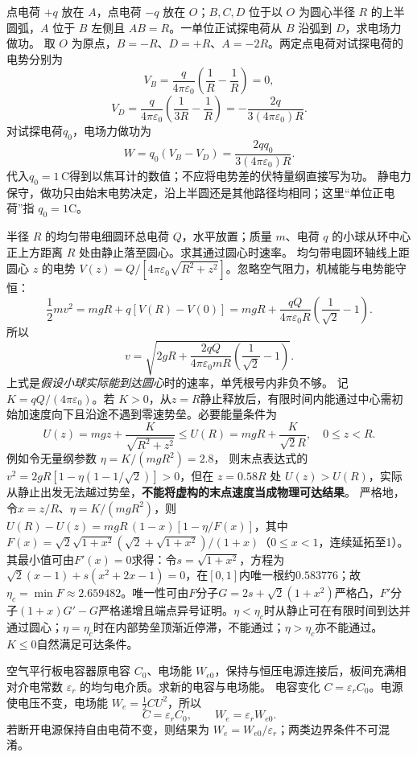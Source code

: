 \problemtext 点电荷 $+q$ 放在 $A$，点电荷 $-q$ 放在 $O$；$B,C,D$ 位于以 $O$ 为圆心半径 $R$ 的上半圆弧，$A$ 位于 $B$ 左侧且 $AB=R$。一单位正试探电荷从 $B$ 沿弧到 $D$，求电场力做功。
\workings 取 $O$ 为原点，$B=-R$、$D=+R$、$A=-2R$。两定点电荷对试探电荷的电势分别为
\[V_B=\frac q{4\pi\varepsilon_0}\left(\frac1R-\frac1R\right)=0,\]
\[V_D=\frac q{4\pi\varepsilon_0}\left(\frac1{3R}-\frac1R\right)
=-\frac{2q}{3(4\pi\varepsilon_0)R}.\]
对试探电荷$q_0$，电场力做功为
\[\boxed{W=q_0(V_B-V_D)=\frac{2qq_0}{3(4\pi\varepsilon_0)R}}.\]
代入$q_0=1\,\mathrm C$得到以焦耳计的数值；不应将电势差的伏特量纲直接写为功。
\crosscheck 静电力保守，做功只由始末电势决定，沿上半圆还是其他路径均相同；这里“单位正电荷”指 $q_0=1$C。

\problemtext 半径 $R$ 的均匀带电细圆环总电荷 $Q$，水平放置；质量 $m$、电荷 $q$ 的小球从环中心正上方距离 $R$ 处由静止落至圆心。求其通过圆心时速率。
\workings 均匀带电圆环轴线上距圆心 $z$ 的电势 $V(z)=Q/[4\pi\varepsilon_0\sqrt{R^2+z^2}]$。忽略空气阻力，机械能与电势能守恒：
\[
\frac12 mv^2=mgR+q[V(R)-V(0)]
=mgR+\frac{qQ}{4\pi\varepsilon_0R}
\left(\frac1{\sqrt2}-1\right).
\]
所以
\[
\boxed{v=\sqrt{2gR+\frac{2qQ}{4\pi\varepsilon_0mR}
\left(\frac1{\sqrt2}-1\right)}}.
\]
\crosscheck 上式是\emph{假设小球实际能到达圆心}时的速率，单凭根号内非负不够。
记 $K=qQ/(4\pi\varepsilon_0)$。若 $K>0$，从$z=R$静止释放后，有限时间内能通过中心需初始加速度向下且沿途不遇到零速势垒。必要能量条件为
\[
U(z)=mgz+\frac{K}{\sqrt{R^2+z^2}}\le
U(R)=mgR+\frac{K}{\sqrt2R},\quad 0\le z<R.
\]
例如令无量纲参数 $\eta=K/(mgR^2)=2.8$，
则末点表达式的 $v^2=2gR[1-\eta(1-1/\sqrt2)]>0$，但在 $z=0.58R$ 处 $U(z)>U(R)$，实际从静止出发无法越过势垒，\textbf{不能将虚构的末点速度当成物理可达结果}。
严格地，令$x=z/R$、$\eta=K/(mgR^2)$，则$U(R)-U(z)=mgR\,(1-x)\left[1-\eta/F(x)\right]$，其中$F(x)=\sqrt2\sqrt{1+x^2}(\sqrt2+\sqrt{1+x^2})/(1+x)$（$0\le x<1$，连续延拓至1）。其最小值可由$F'(x)=0$求得：令$s=\sqrt{1+x^2}$，方程为$\sqrt2(x-1)+s(x^2+2x-1)=0$，在$[0,1]$内唯一根约$0.583776$；故$\eta_c=\min F\approx2.659482$。唯一性可由$F$分子$G=2s+\sqrt2(1+x^2)$严格凸，$F'$分子$(1+x)G'-G$严格递增且端点异号证明。$\eta<\eta_c$时从静止可在有限时间到达并通过圆心；$\eta=\eta_c$时在内部势垒顶渐近停滞，不能通过；$\eta>\eta_c$亦不能通过。$K\le0$自然满足可达条件。

\problemtext 空气平行板电容器原电容 $C_0$、电场能 $W_{e0}$，保持与恒压电源连接后，板间充满相对介电常数 $\varepsilon_r$ 的均匀电介质。求新的电容与电场能。
\workings 电容变化 $C=\varepsilon_r C_0$。电源使电压不变，电场能 $W_e=\tfrac12 C U^2$，所以
\[\boxed{C=\varepsilon_r C_0},\qquad
\boxed{W_e=\varepsilon_r W_{e0}}.
\]
\crosscheck 若断开电源保持自由电荷不变，则结果为 $W_e=W_{e0}/\varepsilon_r$；两类边界条件不可混淆。

